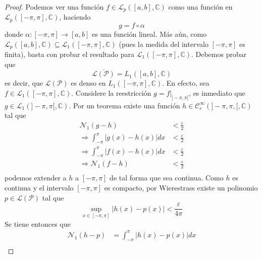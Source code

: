\documentclass[12pt]{report}
\newcounter{it}
\theoremstyle{largebreak}
\newcommand\abs[1]{\ensuremath{\left|#1\right|}}
\newcommand\cf[3]{\ensuremath{#1:#2\rightarrow#3}}
\newcommand{\N}[2]{\ensuremath{\mathcal{N}_{#1}\left(#2\right)}}
\begin{document}
    \begin{proof}
        Podemos ver una función $f\in\mathcal{L}_p([a,b],\mathbb{C})$ como una función en $\mathcal{L}_p([-\pi,\pi],\mathbb{C})$, haciendo
        \begin{equation*}
            g=f\circ \alpha
        \end{equation*}
        donde $\cf{\alpha}{[-\pi,\pi]}{[a,b]}$ es una función lineal. Más aún, como $\mathcal{L}_p([a,b],\mathbb{C})\subseteq\mathcal{L}_1([-\pi,\pi],\mathbb{C})$ (pues la medida del intervalo $[-\pi,\pi]$ es finita), basta con probar el resultado para $\mathcal{L}_1([-\pi,\pi],\mathbb{C})$. Debemos probar que
        \begin{equation*}
            \overline{\mathcal{L}(\mathcal{P})}=L_1([a,b],\mathbb{C})
        \end{equation*}
        es decir, que $\mathcal{L}(\mathcal{P})$ es denso en $L_1([-\pi,\pi],\mathbb{C})$. En efecto, sea $f\in\mathcal{L}_1([-\pi,\pi],\mathbb{C})$. Considere la reestricción $g=f\big|_{]-\pi,\pi[}$, es inmediato que $g\in\mathcal{L}_1(]-\pi,\pi[,\mathbb{C})$. Por un teorema existe una función $h\in\mathcal{C}_c^\infty(]-\pi,\pi,[,\mathbb{C})$ tal que
        \begin{equation*}
            \begin{split}
                \N{1}{g-h}&<\frac{\varepsilon}{2}\\
                \Rightarrow \int_{ -\pi}^{\pi}\abs{g(x)-h(x)}dx&<\frac{\varepsilon}{2}\\
                \Rightarrow \int_{ -\pi}^{\pi}\abs{f(x)-h(x)}dx&<\frac{\varepsilon}{2}\\
                \Rightarrow \N{1}{f-h}&<\frac{\varepsilon}{2}\\
            \end{split}
        \end{equation*}
        podemos extender a $h$ a $[-\pi,\pi]$ de tal forma que sea continua. Como $h$ es continua y el intervalo $[-\pi,\pi]$ es compacto, por Wierestrass existe un polinomio $p\in\mathcal{L}(\mathcal{P})$ tal que
        \begin{equation*}
            \sup_{ x\in[-\pi,\pi]}\abs{h(x)-p(x)}<\frac{\varepsilon}{4\pi}
        \end{equation*}
        Se tiene entonces que
        \begin{equation*}
            \begin{split}
                \N{1}{h-p}&=\int_{ -\pi}^\pi\abs{h(x)-p(x)}dx\\

\end{split}
\end{equation*}
\end{proof}
\end{document}
